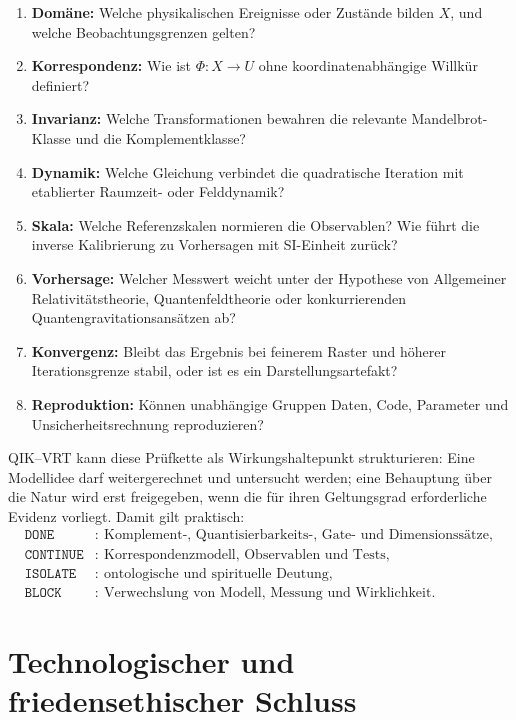 \documentclass[11pt,a4paper]{article}
\theoremstyle{remark}
\begin{document}
\begin{enumerate}
  \item \textbf{Domäne:} Welche physikalischen Ereignisse oder Zustände bilden
  \(X\), und welche Beobachtungsgrenzen gelten?
  \item \textbf{Korrespondenz:} Wie ist \(\Phi:X\to U\) ohne
  koordinatenabhängige Willkür definiert?
  \item \textbf{Invarianz:} Welche Transformationen bewahren die relevante
  Mandelbrot-Klasse und die Komplementklasse?
  \item \textbf{Dynamik:} Welche Gleichung verbindet die quadratische
  Iteration mit etablierter Raumzeit- oder Felddynamik?
  \item \textbf{Skala:} Welche Referenzskalen normieren die Observablen?
  Wie führt die inverse Kalibrierung zu Vorhersagen mit SI-Einheit zurück?
  \item \textbf{Vorhersage:} Welcher Messwert weicht unter der Hypothese von
  Allgemeiner Relativitätstheorie, Quantenfeldtheorie oder konkurrierenden
  Quantengravitationsansätzen ab?
  \item \textbf{Konvergenz:} Bleibt das Ergebnis bei feinerem Raster und
  höherer Iterationsgrenze stabil, oder ist es ein Darstellungsartefakt?
  \item \textbf{Reproduktion:} Können unabhängige Gruppen Daten, Code,
  Parameter und Unsicherheitsrechnung reproduzieren?
\end{enumerate}

QIK--VRT kann diese Prüfkette als Wirkungshaltepunkt strukturieren: Eine
Modellidee darf weitergerechnet und untersucht werden; eine Behauptung über
die Natur wird erst freigegeben, wenn die für ihren Geltungsgrad erforderliche
Evidenz vorliegt. Damit gilt praktisch:
\[
\begin{aligned}
\texttt{DONE}&:\ \text{Komplement-, Quantisierbarkeits-, Gate- und Dimensionssätze},\\
\texttt{CONTINUE}&:\ \text{Korrespondenzmodell, Observablen und Tests},\\
\texttt{ISOLATE}&:\ \text{ontologische und spirituelle Deutung},\\
\texttt{BLOCK}&:\ \text{Verwechslung von Modell, Messung und Wirklichkeit}.
\end{aligned}
\]

\section{Technologischer und friedensethischer Schluss}
\end{document}
